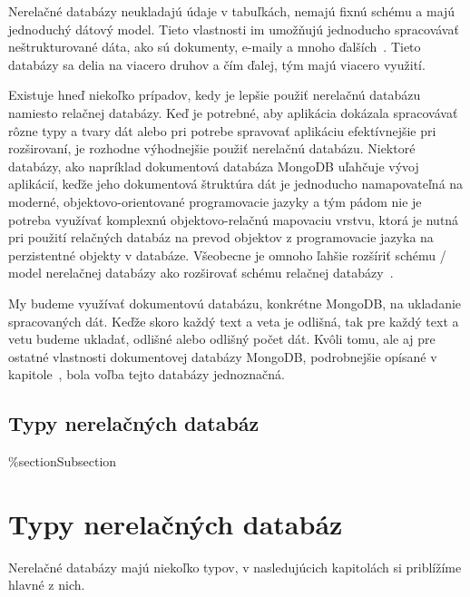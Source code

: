 Nerelačné databázy neukladajú údaje v tabuľkách, nemajú fixnú schému a majú jednoduchý dátový model. Tieto vlastnosti im umožňujú jednoducho spracovávať neštrukturované dáta, ako sú dokumenty, e-maily a mnoho ďalších~\cite{MongoDBvsMySQL2015}. Tieto databázy sa delia na viacero druhov a čím ďalej, tým majú viacero využití.

Existuje hneď niekoľko prípadov, kedy je lepšie použiť nerelačnú databázu namiesto relačnej databázy. Keď je potrebné, aby aplikácia dokázala spracovávať rôzne typy a tvary dát alebo pri potrebe spravovať aplikáciu efektívnejšie pri rozširovaní, je rozhodne výhodnejšie použiť nerelačnú databázu. Niektoré databázy, ako napríklad dokumentová databáza MongoDB uľahčuje vývoj aplikácií, keďže jeho dokumentová štruktúra dát je jednoducho namapovateľná na moderné, objektovo-orientované programovacie jazyky a tým pádom nie je potreba využívať komplexnú objektovo-relačnú mapovaciu vrstvu, ktorá je nutná pri použití relačných databáz na prevod objektov z programovacie jazyka na perzistentné objekty v databáze. Všeobecne je omnoho ľahšie rozšíriť schému / model nerelačnej databázy ako rozširovať schému relačnej databázy~\cite{MongoDBvsMySQLCompared}.

My budeme využívať dokumentovú databázu, konkrétne MongoDB, na ukladanie spracovaných dát. Keďže skoro každý text a veta je odlišná, tak pre každý text a vetu budeme ukladať, odlišné alebo odlišný počet dát. Kvôli tomu, ale aj pre ostatné vlastnosti dokumentovej databázy MongoDB, podrobnejšie opísané v kapitole~, bola voľba tejto databázy jednoznačná.

%
{
	\subsection{Typy nerelačných databáz}
}
{
	\%section{Subsection}
	\section{Typy nerelačných databáz}
}
\label{subsection:types_of_norelation_dbs}
Nerelačné databázy majú niekoľko typov, v nasledujúcich kapitolách si priblížíme hlavné z nich.

